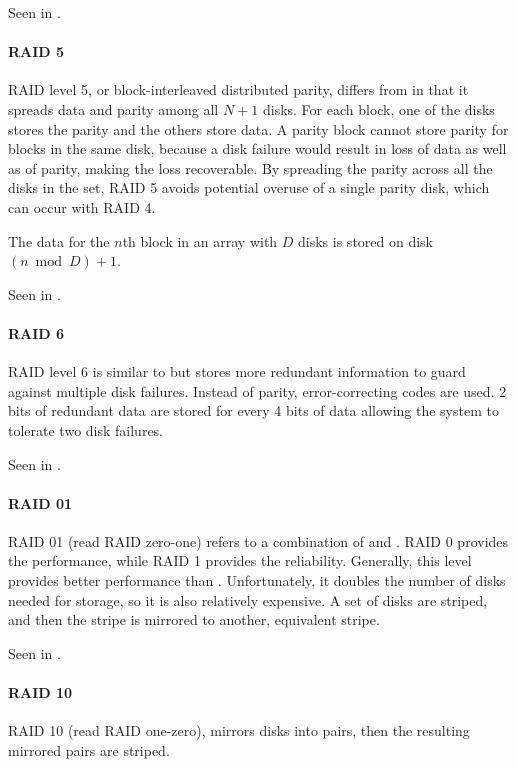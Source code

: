 Seen in .

\paragraph{RAID 5}\label{par:RAID_5}
RAID level 5, or block-interleaved distributed parity, differs from  in that it spreads data and parity among all $N + 1$ disks.
For each block, one of the disks stores the parity and the others store data.
A parity block cannot store parity for blocks in the same disk, because a disk failure would result in loss of data as well as of parity, making the loss recoverable.
By spreading the parity across all the disks in the set, RAID 5 avoids potential overuse of a single parity disk, which can occur with RAID 4.

The data for the $n$th block in an array with $D$ disks is stored on disk $(n \bmod D) + 1$.

Seen in .

\paragraph{RAID 6}\label{par:RAID_6}
RAID level 6 is similar to  but stores more redundant information to guard against multiple disk failures.
Instead of parity, error-correcting codes are used.
2 bits of redundant data are stored for every 4 bits of data allowing the system to tolerate two disk failures.

Seen in .

\paragraph{RAID 01}\label{par:RAID_01}
RAID 01 (read RAID zero-one) refers to a combination of  and .
RAID 0 provides the performance, while RAID 1 provides the reliability.
Generally, this level provides better performance than .
Unfortunately, it doubles the number of disks needed for storage, so it is also relatively expensive.
A set of disks are striped, and then the stripe is mirrored to another, equivalent stripe.

Seen in .

\paragraph{RAID 10}\label{par:RAID_10}
RAID 10 (read RAID one-zero), mirrors disks into pairs, then the resulting mirrored pairs are striped.

